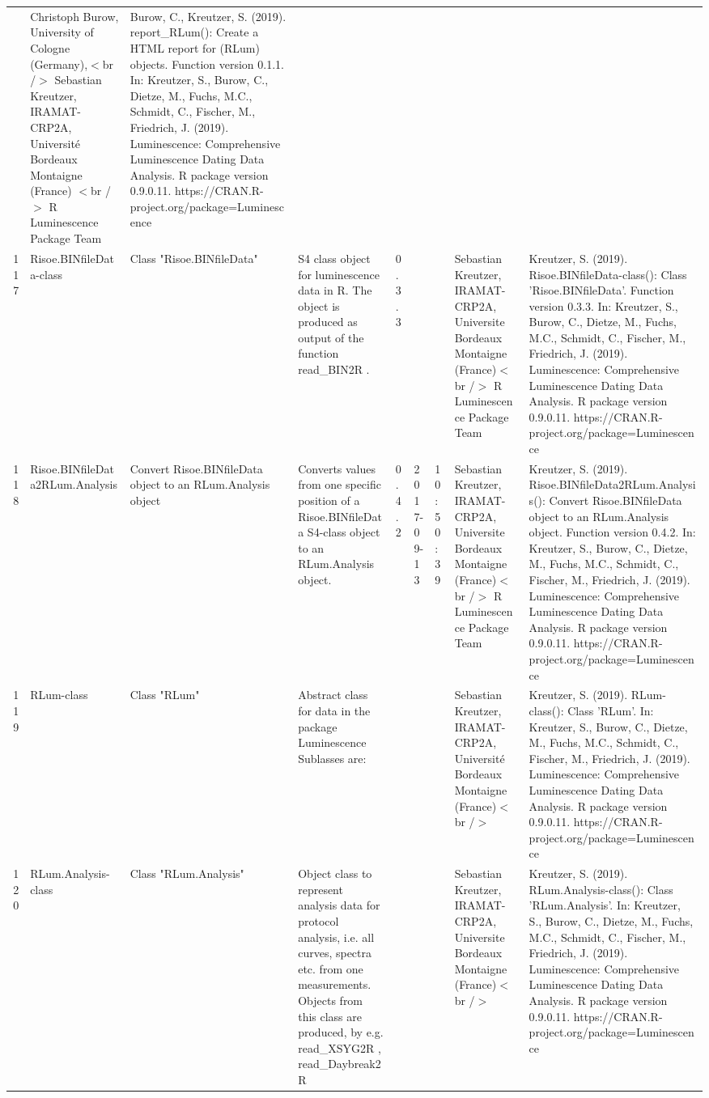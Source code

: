\begin{table}[ht]
\begin{tabular}{rllllllll}
 & Christoph Burow, University of Cologne (Germany),$<$br /$>$ Sebastian Kreutzer, IRAMAT-CRP2A, Université Bordeaux Montaigne (France)  $<$br /$>$  R Luminescence Package Team & Burow, C., Kreutzer, S. (2019). report\_RLum(): Create a HTML report for (RLum) objects. Function version 0.1.1. In: Kreutzer, S., Burow, C., Dietze, M., Fuchs, M.C., Schmidt, C., Fischer, M., Friedrich, J. (2019). Luminescence: Comprehensive Luminescence Dating Data Analysis. R package version 0.9.0.11. https://CRAN.R-project.org/package=Luminescence
 \\ 
  117 & Risoe.BINfileData-class & Class  "Risoe.BINfileData" & S4 class object for luminescence data in R. The object is produced as output of the function  read\_BIN2R . & 0.3.3
 &  &  & Sebastian Kreutzer, IRAMAT-CRP2A, Universite Bordeaux Montaigne (France)$<$br /$>$  R Luminescence Package Team & Kreutzer, S. (2019). Risoe.BINfileData-class(): Class 'Risoe.BINfileData'. Function version 0.3.3. In: Kreutzer, S., Burow, C., Dietze, M., Fuchs, M.C., Schmidt, C., Fischer, M., Friedrich, J. (2019). Luminescence: Comprehensive Luminescence Dating Data Analysis. R package version 0.9.0.11. https://CRAN.R-project.org/package=Luminescence
 \\ 
  118 & Risoe.BINfileData2RLum.Analysis & Convert Risoe.BINfileData object to an RLum.Analysis object & Converts values from one specific position of a Risoe.BINfileData S4-class object to an RLum.Analysis object. & 0.4.2 & 2017-09-13 & 10:50:39
 & Sebastian Kreutzer, IRAMAT-CRP2A, Universite Bordeaux Montaigne (France)$<$br /$>$  R Luminescence Package Team & Kreutzer, S. (2019). Risoe.BINfileData2RLum.Analysis(): Convert Risoe.BINfileData object to an RLum.Analysis object. Function version 0.4.2. In: Kreutzer, S., Burow, C., Dietze, M., Fuchs, M.C., Schmidt, C., Fischer, M., Friedrich, J. (2019). Luminescence: Comprehensive Luminescence Dating Data Analysis. R package version 0.9.0.11. https://CRAN.R-project.org/package=Luminescence
 \\ 
  119 & RLum-class & Class  "RLum" & Abstract class for data in the package Luminescence Sublasses are: &  &  &  & Sebastian Kreutzer, IRAMAT-CRP2A, Université Bordeaux Montaigne (France)$<$br /$>$ & Kreutzer, S. (2019). RLum-class(): Class 'RLum'. In: Kreutzer, S., Burow, C., Dietze, M., Fuchs, M.C., Schmidt, C., Fischer, M., Friedrich, J. (2019). Luminescence: Comprehensive Luminescence Dating Data Analysis. R package version 0.9.0.11. https://CRAN.R-project.org/package=Luminescence
 \\ 
  120 & RLum.Analysis-class & Class  "RLum.Analysis" & Object class to represent analysis data for protocol analysis, i.e. all curves, spectra etc. from one measurements. Objects from this class are produced, by e.g.  read\_XSYG2R ,  read\_Daybreak2R &  &  &  & Sebastian Kreutzer, IRAMAT-CRP2A, Universite Bordeaux Montaigne (France)$<$br /$>$ & Kreutzer, S. (2019). RLum.Analysis-class(): Class 'RLum.Analysis'. In: Kreutzer, S., Burow, C., Dietze, M., Fuchs, M.C., Schmidt, C., Fischer, M., Friedrich, J. (2019). Luminescence: Comprehensive Luminescence Dating Data Analysis. R package version 0.9.0.11. https://CRAN.R-project.org/package=Luminescence

\end{tabular}
\end{table}

